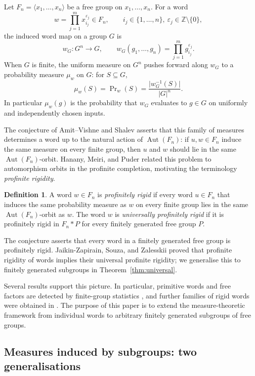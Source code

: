 \documentclass[11pt]{amsart}
\theoremstyle{plain}
\theoremstyle{definition}
\newtheorem{definition}[theorem]{Definition}
\newcommand{\Aut}{\operatorname{Aut}}
\begin{document}
Let $F_n=\langle x_1,\dots,x_n\rangle$ be a free group on $x_1,\dots,x_n$. For a word
\[
  w=\prod_{j=1}^{m}x_{i_j}^{\varepsilon_j}\in F_n,
  \qquad i_j\in\{1,\dots,n\},\ \varepsilon_j\in\mathbb Z\setminus\{0\},
\]
the induced word map on a group $G$ is
\[
  w_G\colon G^{n}\longrightarrow G,\qquad
  w_G(g_1,\dots,g_n)=\prod_{j=1}^{m}g_{i_j}^{\varepsilon_j}.
\]
When $G$ is finite, the uniform measure on $G^{n}$ pushes forward along $w_G$
to a probability measure $\mu_w$ on $G$: for $S\subseteq G$,
\[
  \mu_w(S)=\Pr\nolimits_w(S)=\frac{\bigl|w_G^{-1}(S)\bigr|}{|G|^{n}} .
\]
In particular $\mu_w(g)$ is the probability that $w_G$ evaluates to $g\in G$
on uniformly and independently chosen inputs.

The conjecture of Amit--Vishne and Shalev \cite{AmitVishne,Shalev} asserts that
this family of measures determines a word up to the natural action of
$\Aut(F_n)$: if $u,w\in F_n$ induce the same measure on every finite group,
then $u$ and $w$ should lie in the same $\Aut(F_n)$-orbit. Hanany, Meiri, and
Puder \cite{HMP} related this problem to automorphism orbits in the profinite
completion, motivating the terminology \emph{profinite rigidity}.
\begin{definition}\label{def:word-rigid}
A word $w\in F_n$ is \emph{profinitely rigid} if every word $u\in F_n$ that
induces the same probability measure as $w$ on every finite group lies in the
same $\Aut(F_n)$-orbit as $w$.  The word $w$ is \emph{universally profinitely
rigid} if it is profinitely rigid in $F_n*P$ for every finitely generated free
group $P$.
\end{definition}
The conjecture asserts that every word in a finitely generated free group is
profinitely rigid. Jaikin-Zapirain, Souza, and Zalesskii \cite{JSZ} proved that
profinite rigidity of words implies their universal profinite rigidity; we
generalise this to finitely generated subgroups in Theorem~\ref{thm:universal}.

Several results support this picture. In particular, primitive words and free
factors are detected by finite-group statistics \cite{PP,Wilton, GJ}, and further
families of rigid words were obtained in \cite{HMP,Wilton2,AF}. The purpose
of this paper is to extend the measure-theoretic framework from individual
words to arbitrary finitely generated subgroups of free groups.

\subsection{Measures induced by subgroups: two generalisations}\label{sec:two-notions}
\end{document}
